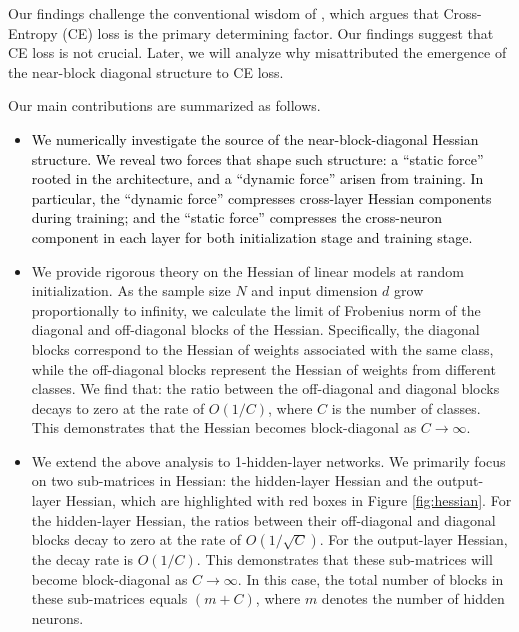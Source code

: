 \documentclass{article}
\newcommand{\1}{^{(1)}}
\newcommand{\2}{^{(2)}}
\newcommand{\yushunrevise}[1]{\textcolor{black}{ #1}}
\begin{document}
Our findings challenge the conventional wisdom of
\citep{collobert2004large}, which argues that Cross-Entropy (CE) loss is the primary determining factor. Our findings suggest that CE loss is not crucial.
Later, we will analyze why \citep{collobert2004large} misattributed the emergence of the near-block diagonal structure to CE loss.


Our main contributions are summarized as follows.  





\begin{itemize}
[topsep=1pt,parsep=1pt,partopsep=1pt, leftmargin=*]
    \item \yushunrevise{We numerically investigate the source of the near-block-diagonal Hessian structure. We reveal two forces that shape such structure:  a ``static force'' rooted in the architecture, and a ``dynamic force'' arisen from training. In particular, the ``dynamic force'' compresses cross-layer Hessian components  during training; and the ``static force'' compresses the cross-neuron component in each layer for both initialization stage and training stage.}
    \item We provide rigorous theory on the Hessian of linear models at random initialization. 
 As the sample size $N$ and input dimension $d$ grow proportionally to infinity, we calculate the limit of Frobenius norm of the diagonal and off-diagonal blocks of the Hessian. Specifically, the diagonal blocks correspond to the Hessian of 
 weights associated with the same class, 
 while the off-diagonal blocks represent the Hessian of weights from different classes.   
 We find that: the ratio between the off-diagonal and diagonal blocks decays to zero at the rate of $O(1/C)$, where $C$ is the number of classes. This demonstrates that the Hessian becomes block-diagonal as $C \rightarrow \infty$.
    \item We extend the above analysis to 1-hidden-layer networks. We primarily focus on two sub-matrices in Hessian:  the hidden-layer Hessian and the output-layer Hessian, which are highlighted with red boxes in Figure \ref{fig:hessian}. For the hidden-layer Hessian, the ratios between their off-diagonal and diagonal blocks decay to zero at the rate of $O(1/\sqrt{C})$. For the output-layer Hessian, the decay rate is $O(1/C)$. This demonstrates that these sub-matrices will become block-diagonal as $C \rightarrow \infty$. In this case, the total number of blocks in these sub-matrices equals  $(m + C)$, where $m$ denotes the number of hidden neurons.
    

\end{itemize}
\end{document}
